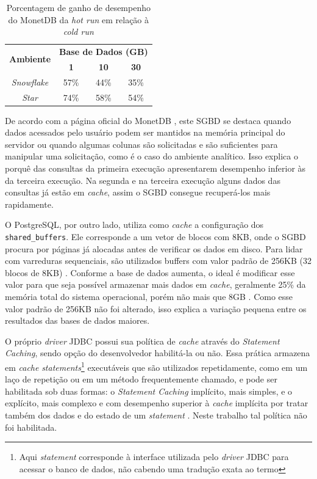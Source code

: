 \begin{table}[h]
        \centering
        \caption{Porcentagem de ganho de desempenho do MonetDB da \textit{hot run} em relação à \textit{cold run}}
        \label{tab:ganho_monet_cold_hot}
        \begin{tabular}{|c|c|c|c|}
        \hline
        \multirow{2}{*}{\textbf{Ambiente}} & \multicolumn{3}{c|}{\textbf{Base de Dados (GB)}} \\ \cline{2-4} 
        & \textbf{1}     & \textbf{10}    & \textbf{30}    \\ \hline
        \textit{Snowflake}                 & 57\%           & 44\%           & 35\%           \\ \hline
        \textit{Star}                      & 74\%           & 58\%           & 54\%           \\ \hline
        \end{tabular}
\end{table}

De acordo com a página oficial do MonetDB \cite{monetdb2017c}, este SGBD se destaca quando dados acessados pelo usuário podem ser mantidos na memória principal do servidor ou quando algumas colunas são solicitadas e são suficientes para manipular uma solicitação, como é o caso do ambiente analítico. Isso explica o porquê das consultas da primeira execução apresentarem desempenho inferior às da terceira execução. Na segunda e na terceira execução alguns dados das consultas já estão em \textit{cache}, assim o SGBD consegue recuperá-los mais rapidamente.

O PostgreSQL, por outro lado, utiliza como \textit{cache} a configuração dos \texttt{shared\_buffers}. Ele corresponde a um vetor de blocos com 8KB, onde o SGBD procura por páginas já alocadas antes de verificar os dados em disco. Para lidar com varreduras sequenciais, são utilizados buffers com valor padrão de 256KB (32 blocos de 8KB) \cite{psqlcache2018r}. Conforme a base de dados aumenta, o ideal é modificar esse valor para que seja possível armazenar mais dados em \textit{cache}, geralmente 25\% da memória total do sistema operacional, porém não mais que 8GB \cite{psql2018conf}. Como esse valor padrão de 256KB não foi alterado, isso explica a variação pequena entre os resultados das bases de dados maiores. 

O próprio \textit{driver} JDBC possui sua política de \textit{cache} através do \textit{Statement Caching}, sendo opção do desenvolvedor habilitá-la ou não. Essa prática armazena em \textit{cache} \textit{statements}\footnote{Aqui \textit{statement} corresponde à interface utilizada pelo \textit{driver} JDBC para acessar o banco de dados, não cabendo uma tradução exata ao termo} executáveis que são utilizados repetidamente, como em um laço de repetição ou em um método frequentemente chamado, e pode ser habilitada sob duas formas: o \textit{Statement Caching} implícito, mais simples, e o explícito, mais complexo e com desempenho superior à \textit{cache} implícita por tratar também dos dados e do estado de um \textit{statement} \cite{jdbc2018cache}. Neste trabalho tal política não foi habilitada.

